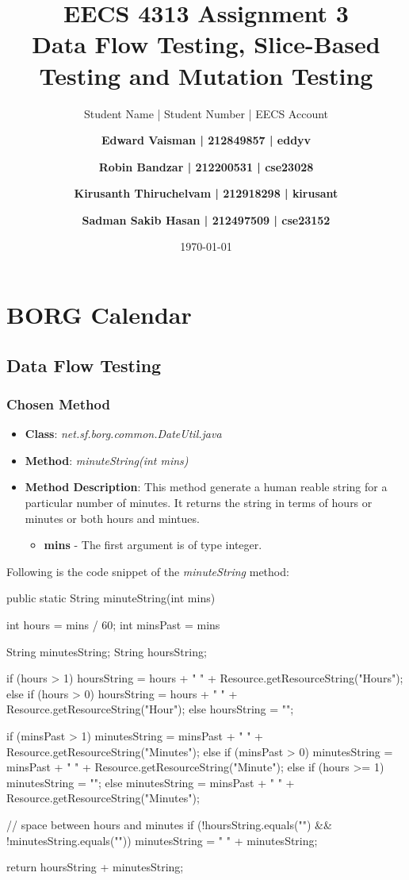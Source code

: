 \documentclass[fontsize=12pt,paper=letter,twoside]{scrartcl}
\author{Student Name | Student Number | EECS Account
\and \textbf{Edward Vaisman | 212849857 | eddyv}
\and \textbf{Robin Bandzar | 212200531 | cse23028}
\and \textbf{Kirusanth Thiruchelvam | 212918298 | kirusant}
\and \textbf{Sadman Sakib Hasan | 212497509 | cse23152}
}
\date{\today} %
\begin{document}
\title{EECS 4313 Assignment 3 \\Data Flow Testing, Slice-Based Testing and Mutation Testing}
\maketitle

\newpage

\tableofcontents


\newpage


\section{BORG Calendar}

\subsection{Data Flow Testing}

\subsubsection{Chosen Method}

\begin{itemize}
\item \textbf{Class}: \emph{net.sf.borg.common.DateUtil.java}
\item \textbf{Method}: \emph{minuteString(int mins)}
\item \textbf{Method Description}:
This method generate a human reable string for a particular number of minutes. It returns the string in terms of hours or minutes or both hours and mintues.
\begin{itemize}
\item \textbf{mins} - The first argument is of type integer.
\end{itemize}
\end{itemize}

\noindent Following is the code snippet of the \emph{minuteString} method:
\begin{code}
	public static String minuteString(int mins) {
		
		int hours = mins / 60;
		int minsPast = mins %
		
		String minutesString;
		String hoursString;
		
		if (hours > 1) {
			hoursString = hours + " " + Resource.getResourceString("Hours");
		} else if (hours > 0) {
			hoursString = hours + " " + Resource.getResourceString("Hour");
		} else {
			hoursString = "";
		}

		if (minsPast > 1) {
			minutesString = minsPast + " " + Resource.getResourceString("Minutes");
		} else if (minsPast > 0) {
			minutesString = minsPast + " " + Resource.getResourceString("Minute");
		} else if (hours >= 1) {
			minutesString = "";
		} else {
			minutesString = minsPast + " " + Resource.getResourceString("Minutes");
		}

		// space between hours and minutes
		if (!hoursString.equals("") && !minutesString.equals(""))
			minutesString = " " + minutesString;

		return hoursString + minutesString;
	}
\end{code}
\end{document}

